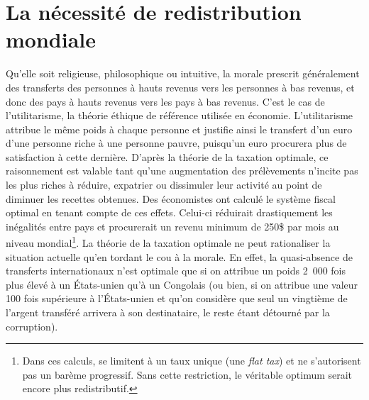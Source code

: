 \documentclass[a5paper,french]{memoir}
\begin{document}
\chapter{La nécessité de redistribution mondiale\label{ch:redistribution_necessaire}}

Qu'elle soit religieuse, philosophique ou intuitive, la morale prescrit généralement des transferts des personnes à hauts revenus vers les personnes à bas revenus, et donc des pays à hauts revenus vers les pays à bas revenus. C'est le cas de l'utilitarisme, la théorie éthique de référence utilisée en économie. L'utilitarisme attribue le même poids à chaque personne et justifie ainsi le transfert d'un euro d'une personne riche à une personne pauvre, puisqu'un euro procurera plus de satisfaction à cette dernière. D'après la théorie de la taxation optimale, ce raisonnement est valable tant qu'une augmentation des prélèvements n'incite pas les plus riches à réduire, expatrier ou dissimuler leur activité au point de diminuer les recettes obtenues. Des économistes ont calculé le système fiscal optimal en tenant compte de ces effets. Celui-ci réduirait drastiquement les inégalités entre pays et procurerait un revenu minimum de 250\$ par mois au niveau mondial\footnote{Dans ces calculs, \citet{kopczuk_limitations_2005} se limitent à un taux unique (une \textit{flat tax}) et ne s'autorisent pas un barème progressif. Sans cette restriction, le véritable optimum serait encore plus redistributif.}. La théorie de la taxation optimale ne peut rationaliser la situation actuelle qu'en tordant le cou à la morale. En effet, la quasi-absence de transferts internationaux n'est optimale que si on attribue un poids 2~000 fois plus élevé à un États-unien qu'à un Congolais (ou bien, si on attribue une valeur 100 fois supérieure à l'États-unien et qu'on considère que seul un vingtième de l'argent transféré arrivera à son destinataire, le reste étant détourné par la corruption). %
\end{document}
